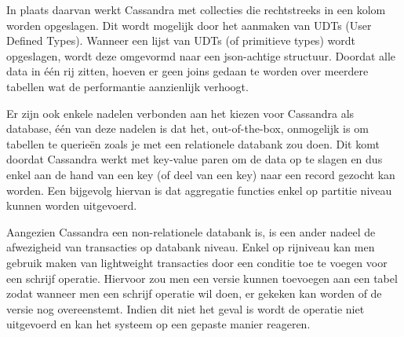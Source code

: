 \documentclass{article}
\begin{document}
	In plaats daarvan werkt Cassandra met collecties die rechtstreeks in een kolom worden opgeslagen. 
	Dit wordt mogelijk door het aanmaken van UDTs (User Defined Types). 
	Wanneer een lijst van UDTs (of primitieve types) wordt opgeslagen, wordt deze omgevormd naar een json-achtige structuur. 
	Doordat alle data in één rij zitten, hoeven er geen joins gedaan te worden over meerdere tabellen 
	wat de performantie aanzienlijk verhoogt.
	\par
	Er zijn ook enkele nadelen verbonden aan het kiezen voor Cassandra als database, \'e\'en van deze nadelen is dat het, out-of-the-box,
	onmogelijk is om tabellen te querieën zoals je met een relationele databank zou doen. 
	Dit komt doordat Cassandra werkt met key-value paren om de data op te slagen en dus enkel aan de hand van een key 
	(of deel van een key) naar een record gezocht kan worden. 
	Een bijgevolg hiervan is dat aggregatie functies enkel op partitie niveau kunnen worden uitgevoerd.
	\par
	Aangezien Cassandra een non-relationele databank is, is een ander nadeel de afwezigheid van transacties op databank niveau.
	Enkel op rijniveau kan men gebruik maken van lightweight transacties door een conditie toe te voegen voor een schrijf operatie.
	Hiervoor zou men een versie kunnen toevoegen aan een tabel zodat wanneer men een schrijf operatie wil doen,
	er gekeken kan worden of de versie nog overeenstemt. 
	Indien dit niet het geval is wordt de operatie niet uitgevoerd en kan het systeem op een gepaste manier reageren.
\end{document}
